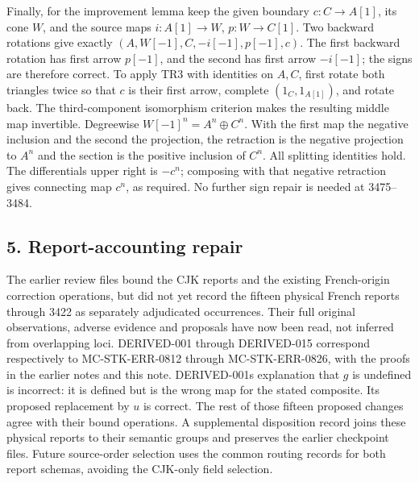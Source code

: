 Finally,\allowbreak{} for the improvement lemma keep the given boundary \(c:C\to A[1]\),\allowbreak{} its cone \(W\),\allowbreak{} and the source maps \(i:A[1]\to W\),\allowbreak{} \(p:W\to C[1]\). Two backward rotations give exactly \((A,W[-1],C,-i[-1],p[-1],c)\). The first backward rotation has first arrow \(p[-1]\),\allowbreak{} and the second has first arrow \(-i[-1]\); the signs are therefore correct. To apply TR3 with identities on \(A,C\),\allowbreak{} first rotate both triangles twice so that \(c\) is their first arrow,\allowbreak{} complete \((1_C,1_{A[1]})\),\allowbreak{} and rotate back. The third-component isomorphism criterion makes the resulting middle map invertible. Degreewise \(W[-1]^n=A^n\oplus C^n\). With the first map the negative inclusion and the second the projection,\allowbreak{} the retraction is the negative projection to \(A^n\) and the section is the positive inclusion of \(C^n\). All splitting identities hold. The differential\textquotesingle s upper right is \(-c^n\); composing with that negative retraction gives connecting map \(c^n\),\allowbreak{} as required. No further sign repair is needed at 3475–\allowbreak{}3484.

\subsection{5. Report-accounting repair}\label{proofs-2995-3485-report-accounting-repair}

The earlier review files bound the CJK reports and the existing French-origin correction operations,\allowbreak{} but did not yet record the fifteen physical French reports through 3422 as separately adjudicated occurrences. Their full original observations,\allowbreak{} adverse evidence and proposals have now been read,\allowbreak{} not inferred from overlapping loci. DERIVED-001 through DERIVED-015 correspond respectively to MC-STK-ERR-0812 through MC-STK-ERR-0826,\allowbreak{} with the proofs in the earlier notes and this note. DERIVED-001\textquotesingle s explanation that \(g\) is undefined is incorrect:\allowbreak{} it is defined but is the wrong map for the stated composite. Its proposed replacement by \(u\) is correct. The rest of those fifteen proposed changes agree with their bound operations. A supplemental disposition record joins these physical reports to their semantic groups and preserves the earlier checkpoint files. Future source-order selection uses the common routing records for both report schemas,\allowbreak{} avoiding the CJK-only field selection.
